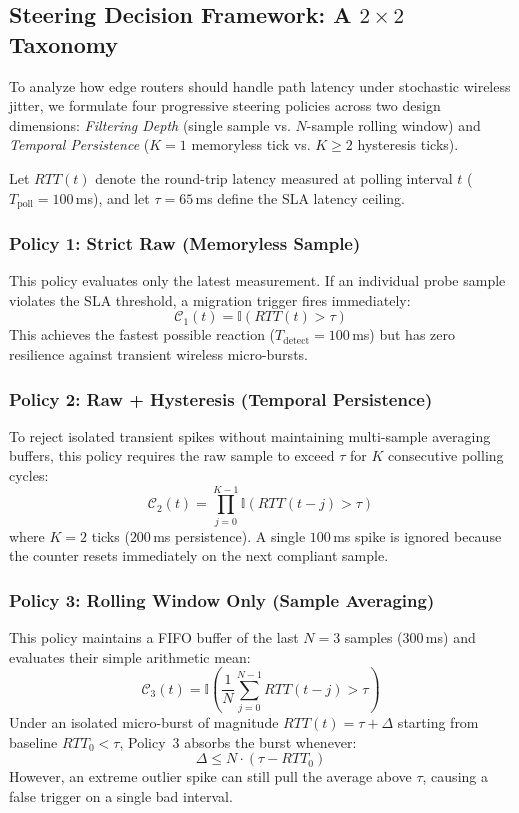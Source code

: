 \documentclass[conference]{IEEEtran}
\begin{document}
\textcolor{extensioncolor}{
\subsection{Steering Decision Framework: A $2 \times 2$ Taxonomy}
To analyze how edge routers should handle path latency under stochastic wireless jitter, we formulate four progressive steering policies across two design dimensions: \emph{Filtering Depth} (single sample vs. $N$-sample rolling window) and \emph{Temporal Persistence} ($K=1$ memoryless tick vs. $K \ge 2$ hysteresis ticks).

Let $RTT(t)$ denote the round-trip latency measured at polling interval $t$ ($T_{\text{poll}} = 100$\,ms), and let $\tau = 65$\,ms define the SLA latency ceiling.

\subsubsection{Policy 1: Strict Raw (Memoryless Sample)}
This policy evaluates only the latest measurement. If an individual probe sample violates the SLA threshold, a migration trigger fires immediately:
\begin{equation}
\mathcal{C}_{1}(t) = \mathbb{I}\left( RTT(t) > \tau \right)
\end{equation}
This achieves the fastest possible reaction ($T_{\text{detect}} = 100$\,ms) but has zero resilience against transient wireless micro-bursts.

\subsubsection{Policy 2: Raw + Hysteresis (Temporal Persistence)}
To reject isolated transient spikes without maintaining multi-sample averaging buffers, this policy requires the raw sample to exceed $\tau$ for $K$ consecutive polling cycles:
\begin{equation}
\mathcal{C}_{2}(t) = \prod_{j=0}^{K-1} \mathbb{I}\left( RTT(t - j) > \tau \right)
\end{equation}
where $K = 2$ ticks ($200$\,ms persistence). A single $100$\,ms spike is ignored because the counter resets immediately on the next compliant sample.

\subsubsection{Policy 3: Rolling Window Only (Sample Averaging)}
This policy maintains a FIFO buffer of the last $N = 3$ samples ($300$\,ms) and evaluates their simple arithmetic mean:
\begin{equation}
\mathcal{C}_{3}(t) = \mathbb{I}\left( \frac{1}{N}\sum_{j=0}^{N-1} RTT(t - j) > \tau \right)
\end{equation}
Under an isolated micro-burst of magnitude $RTT(t) = \tau + \Delta$ starting from baseline $RTT_0 < \tau$, Policy~3 absorbs the burst whenever:
\begin{equation}
\Delta \le N \cdot (\tau - RTT_0)
\end{equation}
However, an extreme outlier spike can still pull the average above $\tau$, causing a false trigger on a single bad interval.

}
\end{document}
